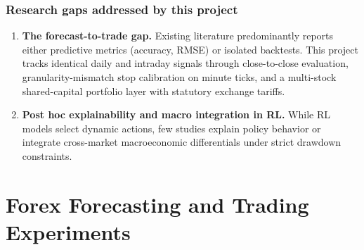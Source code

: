 \documentclass[12pt,a4paper,twoside,openany]{report}
\begin{document}
\subsection*{Research gaps addressed by this project}
\begin{enumerate}[leftmargin=1.5cm, itemsep=2pt]
  \item \textbf{The forecast-to-trade gap.} Existing literature predominantly reports either predictive metrics (accuracy, RMSE) or isolated backtests. This project tracks identical daily and intraday signals through close-to-close evaluation, granularity-mismatch stop calibration on minute ticks, and a multi-stock shared-capital portfolio layer with statutory exchange tariffs.
  \item \textbf{Post hoc explainability and macro integration in RL.} While RL models select dynamic actions, few studies explain policy behavior or integrate cross-market macroeconomic differentials under strict drawdown constraints.
\end{enumerate}


\chapter{Forex Forecasting and Trading Experiments}
\end{document}
